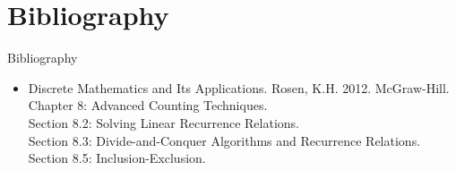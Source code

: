\documentclass{beamer}
\begin{document}
\section*{Bibliography}

\begin{frame}{Bibliography}
    \begin{itemize}
        \item Discrete Mathematics and Its Applications. Rosen, K.H. 2012. McGraw-Hill. \\
        Chapter 8: Advanced Counting Techniques. \\
        Section 8.2: Solving Linear Recurrence Relations. \\
        Section 8.3: Divide-and-Conquer Algorithms and Recurrence Relations. \\
        Section 8.5: Inclusion-Exclusion. 
    \end{itemize}
\end{frame}
\end{document}
